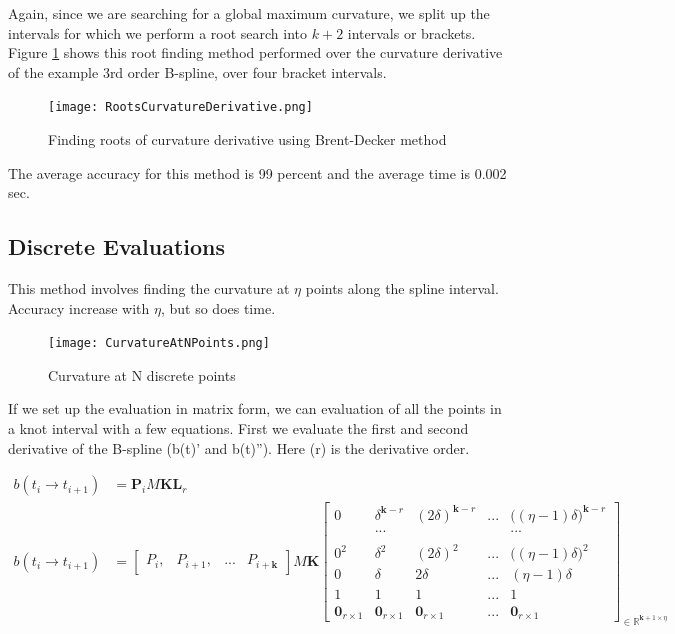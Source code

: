 \documentclass{article}
\begin{document}
Again, since we are searching for a global maximum curvature, we split up the intervals for which we perform a root search into \(k + 2\) intervals or brackets. Figure \ref{RootsCurvatureDerivative} shows this root finding method performed over the curvature derivative of the example 3rd order B-spline, over four bracket intervals.

\begin{figure}[H]
\centering
\texttt{[image: RootsCurvatureDerivative.png]}
\caption{Finding roots of curvature derivative using Brent-Decker method}
\label{RootsCurvatureDerivative}
\end{figure}

The average accuracy for this method is 99 percent and the average time is 0.002 sec.

\subsection{Discrete Evaluations}
This method involves finding the curvature at \(\eta\) points along the spline interval. Accuracy increase with \(\eta\), but so does time. 

\begin{figure}[H]
\begin{center}
\texttt{[image: CurvatureAtNPoints.png]}
\end{center}
\caption{Curvature at N discrete points}
\label{Fig:CurvatureAtNPoints}
\end{figure}

If we set up the evaluation in matrix form, we can evaluation of all the points in a knot interval with a few equations. First we evaluate the first and second derivative of the B-spline (b(t)' and b(t)''). Here (r) is the derivative order.



\begin{equation}
\begin{aligned}
    b(t_i \rightarrow t_{i+1}) &= \textbf{P}_i M \textbf{K}\textbf{L}_r\\
    b(t_i \rightarrow t_{i+1}) &= \begin{bmatrix} P_i, & P_{i+1}, & ... & P_{i+\textbf{k}} \end{bmatrix} M \textbf{K} \begin{bmatrix} 0 & \delta^{\textbf{k}-r} & (2\delta)^{\textbf{k}-r}& ... & \big((\eta-1) \delta\big)^{\textbf{k}-r}\\
    & ... & & & ... \\ \\
    0^2 &  \delta^2 & (2\delta)^2 & ... & \big((\eta-1) \delta\big)^2 \\ 
     0 &  \delta & 2\delta & ... & (\eta-1) \delta \\ 
     1 & 1 & 1 & ... & 1 \\
     \textbf{0}_{r \times 1} & \textbf{0}_{r \times 1} & \textbf{0}_{r \times 1} & ... & \textbf{0}_{r \times 1}\end{bmatrix}_{\in \mathbb{R}^{\textbf{k}+1 \times \eta}}
\end{aligned}
\end{equation}
\end{document}
